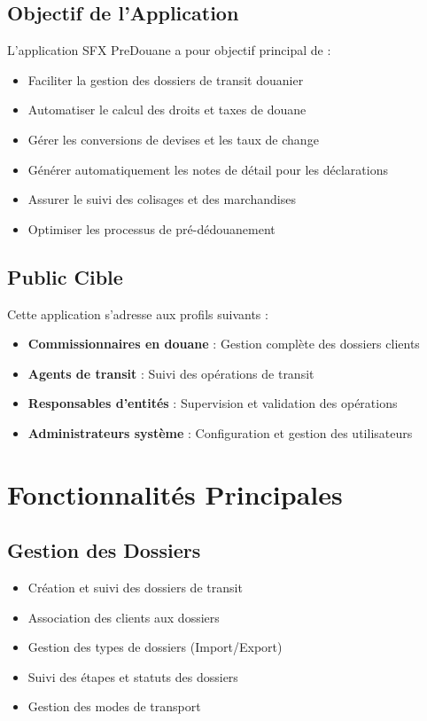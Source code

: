 \documentclass[12pt,a4paper]{report}
\begin{document}
\subsection{Objectif de l'Application}

L'application SFX PreDouane a pour objectif principal de :

\begin{itemize}[leftmargin=*]
    \item Faciliter la gestion des dossiers de transit douanier
    \item Automatiser le calcul des droits et taxes de douane
    \item Gérer les conversions de devises et les taux de change
    \item Générer automatiquement les notes de détail pour les déclarations
    \item Assurer le suivi des colisages et des marchandises
    \item Optimiser les processus de pré-dédouanement
\end{itemize}

\subsection{Public Cible}

Cette application s'adresse aux profils suivants :

\begin{itemize}[leftmargin=*]
    \item \textbf{Commissionnaires en douane} : Gestion complète des dossiers clients
    \item \textbf{Agents de transit} : Suivi des opérations de transit
    \item \textbf{Responsables d'entités} : Supervision et validation des opérations
    \item \textbf{Administrateurs système} : Configuration et gestion des utilisateurs
\end{itemize}

\section{Fonctionnalités Principales}

\subsection{Gestion des Dossiers}
\begin{itemize}[leftmargin=*]
    \item Création et suivi des dossiers de transit
    \item Association des clients aux dossiers
    \item Gestion des types de dossiers (Import/Export)
    \item Suivi des étapes et statuts des dossiers
    \item Gestion des modes de transport
\end{itemize}
\end{document}
